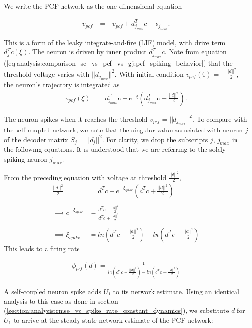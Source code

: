 \begin{enumerate}
We write the PCF network as the one-dimensional equation

\begin{align*}
	v_{pcf} &= 
	- v_{pcf}
	+ d_{j_{max}}^T c 
	- o_{j_{max}}.
\end{align*}

This is a form of the leaky integrate-and-fire (LIF) model, with drive term $d_j^T c(\xi)$. The neuron is driven by inner product $d_{j_{max}}^T c$. Note from equation (\ref{eq:analysis:comparison_sc_vs_pcf_vs_gj:pcf_spiking_behavior}) that the threshold voltage varies with $||d_{j_{max}}||^2$. With initial condition $v_{pcf}(0) = - \frac{||d||^2}{2}$, the neuron's trajectory is integrated as 
\begin{align*}
	v_{pcf}(\xi)
	&= 
	d_{j_{max}}^T c - e^{-\xi} 
	\left(
		d_{j_{max}}^T c + \frac{||d||^2}{2}
	\right). 
\end{align*}

The neuron spikes when it reaches the threshold $v_{pcf} = ||d_{j_{max}}||^2$. To compare with the self-coupled network, we note that the singular value associated with neuron $j$ of the decoder matrix $S_j = ||d_j||^2$. For clarity, we drop the subscripts $j$, $j_{max}$ in the following equations. It is understood that we are referring to the solely spiking neuron $j_{max}$.

From the preceding equation with voltage at  threshold $\frac{||d||^2}{2}$,
\begin{align*}
	\frac{||d||^2}{2}
	&= 
	d^T c - e^{-\xi_{spike}} 
	\left(
		d^T c + \frac{||d||^2}{2}
	\right)
	\\
	\\
	\implies
	e^{-\xi_{spike}}
	&= 
		\frac
	{
		d^T c - \frac{||d||^2}{2}
	}
	{
		d^T c + \frac{||d||^2}{2}
	}
	\\
	\\
	\implies
	\xi_{spike}
	&= 
	ln
	\left(
		d^T c + \frac{||d||^2}{2}
	\right)
	-
	ln
	\left(
		d^T c - \frac{||d||^2}{2}
	\right)		
\end{align*}
This leads to a firing rate 

\begin{align}
\label{eq:analysis:comparison_sc_vs_pcf_vs_gj:const_dynamics:pcf_spike_rate}
	\phi_{pcf}
	\left(
		d
	\right)
	 =
	 \frac
	 {
	 	1
	 }
	 {
		ln
		\left(
			d^T c + \frac{||d||^2}{2}
		\right)
		-
		ln
		\left(
			d^T c - \frac{||d||^2}{2}
		\right)		
	}
\end{align}


A self-coupled neuron spike adds $U_1$ to its network estimate. Using an identical analysis to this case as done in section (\ref{section:analysis:rmse_vs_spike_rate_constant_dynamics}), we substitute $d$ for $U_1$ to arrive at the steady state network estimate of the PCF network:


\end{enumerate}
